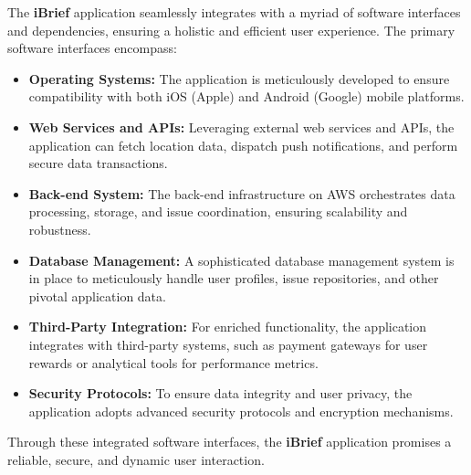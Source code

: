 The \textbf{iBrief} application seamlessly integrates with a myriad of software interfaces and dependencies, ensuring a holistic and efficient user experience. The primary software interfaces encompass:

\begin{itemize}
    \item \textbf{Operating Systems:} The application is meticulously developed to ensure compatibility with both \gls{iOS} (Apple) and \gls{Android} (Google) mobile platforms.
    
    \item \textbf{Web Services and \gls{API}s:} Leveraging external web services and \gls{API}s, the application can fetch location data, dispatch push notifications, and perform secure data transactions.
    
    \item \textbf{Back-end System:} The \gls{back-end} infrastructure on \gls{AWS} orchestrates data processing, storage, and issue coordination, ensuring scalability and robustness.
    
    \item \textbf{Database Management:} A sophisticated database management system is in place to meticulously handle user profiles, issue repositories, and other pivotal application data.
    
    \item \textbf{Third-Party Integration:} For enriched functionality, the application integrates with third-party systems, such as payment gateways for user rewards or analytical tools for performance metrics.
    
    \item \textbf{Security Protocols:} To ensure data integrity and user privacy, the application adopts advanced security protocols and encryption mechanisms.
\end{itemize}

Through these integrated software interfaces, the \textbf{iBrief} application promises a reliable, secure, and dynamic user interaction.

